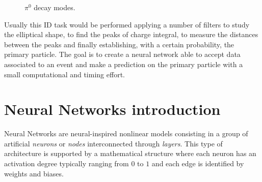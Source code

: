 \begin{figure}
	\centering
	 \quad
	\caption{$\pi^0$ decay modes.}
	\label{fig:pi_decays}
\end{figure}

Usually this ID task would be performed applying a number of filters to study the elliptical shape, to find the peaks of charge integral, to measure the distances between the peaks and finally establishing, with a certain probability, the primary particle. The goal is to create a neural network able to accept data associated to an event and make a prediction on the primary particle with a small computational and timing effort.\\

\section{Neural Networks introduction}
Neural Networks are neural-inspired nonlinear models consisting in a group of artificial \textit{neurons} or \textit{nodes} interconnected through \textit{layers}. This type of architecture is supported by a mathematical structure where each neuron has an activation degree typically ranging from $0$ to $1$ and each edge is identified by weights and biases.\\


